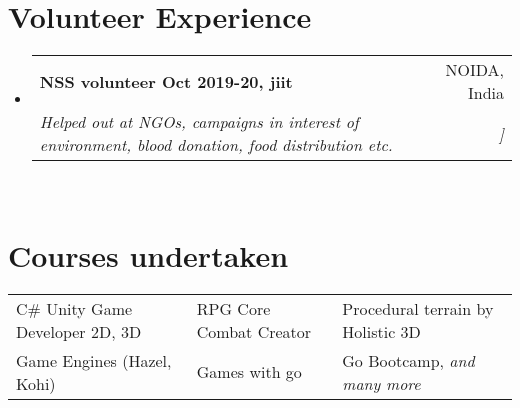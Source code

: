 \documentclass[a4paper,20pt]{article}
\makeatletter
\newcommand{\resumeSubheading}[4]{
  \vspace{-1pt}\item
    \begin{tabular*}{0.97\textwidth}{l@{\extracolsep{\fill}}r}
      \textbf{#1} & #2 \\
      \textit{#3} & \textit{#4} \\
    \end{tabular*}\vspace{-5pt}
}
\newcommand{\resumeSubHeadingListStart}{\begin{itemize}[leftmargin=*]}
\newcommand{\resumeSubHeadingListEnd}{\end{itemize}}
\makeatother
\begin{document}
\section{Volunteer Experience}
  \resumeSubHeadingListStart
    \resumeSubheading
        {NSS volunteer Oct 2019-20, jiit}{NOIDA, India}
        {Helped out at NGOs, campaigns in interest of environment, blood donation, food distribution etc. }] \\
  \resumeSubHeadingListEnd

\section{Courses undertaken}
\begin{tabular}{p{}p{}p{}}
    {C\# Unity Game Developer 2D, 3D}&{RPG Core Combat Creator}&{Procedural terrain by Holistic 3D}\\
    {Game Engines (Hazel, Kohi)}&{Games with go}&{Go Bootcamp, \textit{and many more}}\\
\end{tabular}
\end{document}
